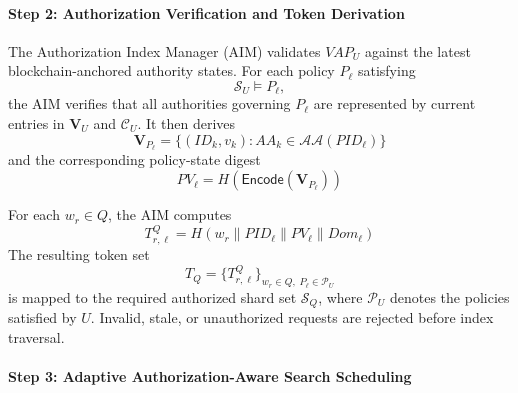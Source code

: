 \documentclass{ieeetj}
\theoremstyle{ieee-style}
\begin{document}
\paragraph*{Step 2: Authorization Verification and Token Derivation}

The Authorization Index Manager (AIM) validates $VAP_U$ against the
latest blockchain-anchored authority states. For each policy $P_\ell$
satisfying
\begin{equation}
\mathcal{S}_U\models P_\ell,
\label{eq:policy-satisfaction}
\end{equation}
the AIM verifies that all authorities governing $P_\ell$ are represented
by current entries in $\mathbf{V}_U$ and $\mathcal{C}_U$. It then derives
\begin{equation}
\mathbf{V}_{P_\ell}
=
\{(ID_k,v_k):AA_k\in\mathcal{AA}(PID_\ell)\}
\end{equation}
and the corresponding policy-state digest
\begin{equation}
PV_\ell=
H\!\left(
\mathsf{Encode}(\mathbf{V}_{P_\ell})
\right)
\end{equation}

For each $w_r\in Q$, the AIM computes
\begin{equation}
T_{r,\ell}^{Q}
=
H\!\left(
w_r\parallel PID_\ell\parallel PV_\ell\parallel Dom_\ell
\right)
\label{eq:query-token}
\end{equation}
The resulting token set
\begin{equation}
T_Q=
\{T_{r,\ell}^{Q}\}_{w_r\in Q,\;P_\ell\in\mathcal{P}_U}
\end{equation}
is mapped to the required authorized shard set $\mathcal{S}_Q$, where
$\mathcal{P}_U$ denotes the policies satisfied by $U$. Invalid, stale,
or unauthorized requests are rejected before index traversal.

\paragraph*{Step 3: Adaptive Authorization-Aware Search Scheduling}
\end{document}
